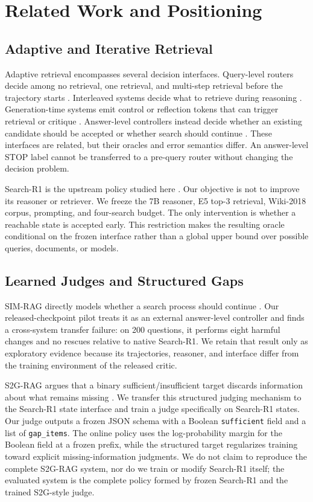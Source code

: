 \documentclass[11pt,a4paper]{article}
\newcommand{\model}[1]{\texttt{#1}}
\begin{document}
\section{Related Work and Positioning}

\subsection{Adaptive and Iterative Retrieval}

Adaptive retrieval encompasses several decision interfaces. Query-level routers decide among no retrieval, one retrieval, and multi-step retrieval before the trajectory starts \citep{jeong2024adaptiverag}. Interleaved systems decide what to retrieve during reasoning \citep{trivedi2023ircot,jin2025searchr1}. Generation-time systems emit control or reflection tokens that can trigger retrieval or critique \citep{asai2023selfrag}. Answer-level controllers instead decide whether an existing candidate should be accepted or whether search should continue \citep{yang2025simrag}. These interfaces are related, but their oracles and error semantics differ. An answer-level STOP label cannot be transferred to a pre-query router without changing the decision problem.

Search-R1 is the upstream policy studied here \citep{jin2025searchr1}. Our objective is not to improve its reasoner or retriever. We freeze the 7B reasoner, E5 top-3 retrieval, Wiki-2018 corpus, prompting, and four-search budget. The only intervention is whether a reachable state is accepted early. This restriction makes the resulting oracle conditional on the frozen interface rather than a global upper bound over possible queries, documents, or models.

\subsection{Learned Judges and Structured Gaps}

SIM-RAG directly models whether a search process should continue \citep{yang2025simrag}. Our released-checkpoint pilot treats it as an external answer-level controller and finds a cross-system transfer failure: on 200 questions, it performs eight harmful changes and no rescues relative to native Search-R1. We retain that result only as exploratory evidence because its trajectories, reasoner, and interface differ from the training environment of the released critic.

S2G-RAG argues that a binary sufficient/insufficient target discards information about what remains missing \citep{li2026s2grag}. We transfer this structured judging mechanism to the Search-R1 state interface and train a judge specifically on Search-R1 states. Our judge outputs a frozen JSON schema with a Boolean \model{sufficient} field and a list of \model{gap\_items}. The online policy uses the log-probability margin for the Boolean field at a frozen prefix, while the structured target regularizes training toward explicit missing-information judgments. We do not claim to reproduce the complete S2G-RAG system, nor do we train or modify Search-R1 itself; the evaluated system is the complete policy formed by frozen Search-R1 and the trained S2G-style judge.
\end{document}

